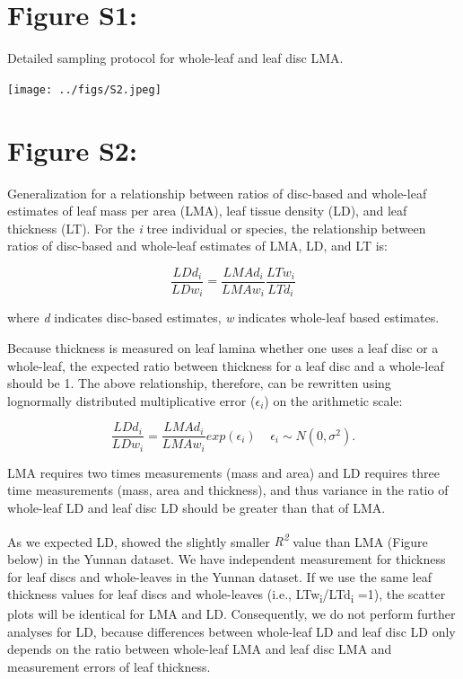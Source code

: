 \documentclass[
  12pt,
]{article}
\begin{document}
\newpage

\hypertarget{figure-s1}{%
\section{Figure S1:}\label{figure-s1}}

Detailed sampling protocol for whole-leaf and leaf disc LMA.

\texttt{[image: ../figs/S2.jpeg]}

\newpage

\hypertarget{figure-s2}{%
\section{Figure S2:}\label{figure-s2}}

Generalization for a relationship between ratios of disc-based and whole-leaf estimates of leaf mass per area (LMA), leaf tissue density (LD), and leaf thickness (LT).
For the \emph{i} tree individual or species, the relationship between ratios of disc-based and whole-leaf estimates of LMA, LD, and LT is:

\[
\frac{LDd_i}{LDw_i} = \frac{LMAd_i}{LMAw_i} \frac{LTw_i}{LTd_i}
\]

where \emph{d} indicates disc-based estimates, \emph{w} indicates whole-leaf based estimates.

Because thickness is measured on leaf lamina whether one uses a leaf disc or a whole-leaf, the expected ratio between thickness for a leaf disc and a whole-leaf should be 1.
The above relationship, therefore, can be rewritten using lognormally distributed multiplicative error (\(\epsilon_i\)) on the arithmetic scale:

\[
\frac{LDd_i}{LDw_i} = \frac{LMAd_i}{LMAw_i} exp(\epsilon_i) \;\;\;\;\epsilon_i \sim N(0, \sigma^2).
\]

LMA requires two times measurements (mass and area) and LD requires three time measurements (mass, area and thickness), and thus variance in the ratio of whole-leaf LD and leaf disc LD should be greater than that of LMA.

As we expected LD, showed the slightly smaller \emph{R\textsuperscript{2}} value than LMA (Figure below) in the Yunnan dataset.
We have independent measurement for thickness for leaf discs and whole-leaves in the Yunnan dataset.
If we use the same leaf thickness values for leaf discs and whole-leaves (i.e., LTw\textsubscript{i}/LTd\textsubscript{i} =1), the scatter plots will be identical for LMA and LD.
Consequently, we do not perform further analyses for LD, because differences between whole-leaf LD and leaf disc LD only depends on the ratio between whole-leaf LMA and leaf disc LMA and measurement errors of leaf thickness.
\end{document}
